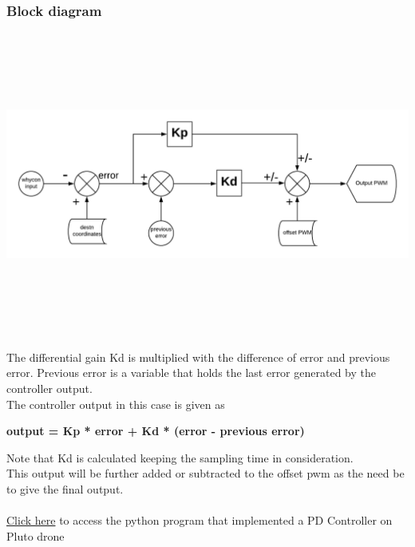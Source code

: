 \documentclass[a4paper,12pt,oneside]{book}
\begin{document}
\subsubsection{\textbf{Block diagram}}
\begin{flushleft}
\includegraphics[width = 15cm , height= 10cm]{PD.png}
\end{flushleft}
The differential gain Kd is multiplied with the difference of error and previous error. Previous error is a variable that holds the last error generated by the controller output.\\
The controller output in this case is given as 
\begin{center}
\textbf{output  = Kp * error + Kd * (error - previous error)}  \\ 
\end{center} 
Note that Kd is calculated keeping the sampling time in consideration.\\
This output will be further  added or subtracted to the offset pwm as the need be to give the final output.\\ \\
\href{https://github.com/eYSIP-2018/Autotuning-of-Controller-For-Drone/blob/karthik/PD-controller.py}{Click here} to access the python program that implemented a PD Controller on Pluto drone\\
\end{document}
